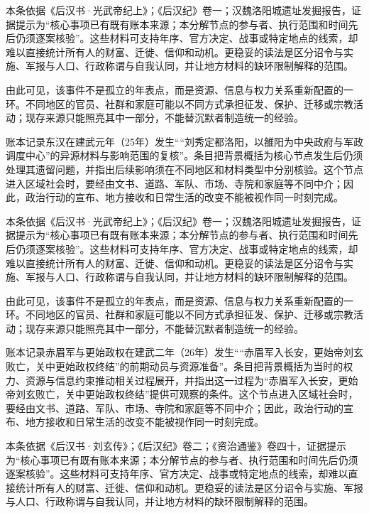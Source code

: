 本条依据《后汉书·光武帝纪上》；《后汉纪》卷一；汉魏洛阳城遗址发掘报告，证据提示为“核心事项已有既有账本来源；本分解节点的参与者、执行范围和时间先后仍须逐案核验”。这些材料可支持年序、官方决定、战事或特定地点的线索，却难以直接统计所有人的财富、迁徙、信仰和动机。更稳妥的读法是区分诏令与实施、军报与人口、行政称谓与自我认同，并让地方材料的缺环限制解释的范围。

由此可见，该事件不是孤立的年表点，而是资源、信息与权力关系重新配置的一环。不同地区的官员、社群和家庭可能以不同方式承担征发、保护、迁移或宗教活动；现存来源只能照亮其中一部分，不能替沉默者制造统一的经验。

账本记录东汉在建武元年（25年）发生““刘秀定都洛阳，以雒阳为中央政府与军政调度中心”的异源材料与影响范围的复核”。条目把背景概括为核心节点发生后仍须处理其遗留问题，并指出后续影响须在不同地区和材料类型中分别核验。这个节点进入区域社会时，要经由文书、道路、军队、市场、寺院和家庭等不同中介；因此，政治行动的宣布、地方接收和日常生活的改变不能被视作同一时刻完成。

本条依据《后汉书·光武帝纪上》；《后汉纪》卷一；汉魏洛阳城遗址发掘报告，证据提示为“核心事项已有既有账本来源；本分解节点的参与者、执行范围和时间先后仍须逐案核验”。这些材料可支持年序、官方决定、战事或特定地点的线索，却难以直接统计所有人的财富、迁徙、信仰和动机。更稳妥的读法是区分诏令与实施、军报与人口、行政称谓与自我认同，并让地方材料的缺环限制解释的范围。

由此可见，该事件不是孤立的年表点，而是资源、信息与权力关系重新配置的一环。不同地区的官员、社群和家庭可能以不同方式承担征发、保护、迁移或宗教活动；现存来源只能照亮其中一部分，不能替沉默者制造统一的经验。

账本记录赤眉军与更始政权在建武二年（26年）发生““赤眉军入长安，更始帝刘玄败亡，关中更始政权终结”的前期动员与资源准备”。条目把背景概括为当时的权力、资源与信息约束推动相关过程展开，并指出这一过程为“赤眉军入长安，更始帝刘玄败亡，关中更始政权终结”提供可观察的条件。这个节点进入区域社会时，要经由文书、道路、军队、市场、寺院和家庭等不同中介；因此，政治行动的宣布、地方接收和日常生活的改变不能被视作同一时刻完成。

本条依据《后汉书·刘玄传》；《后汉纪》卷二；《资治通鉴》卷四十，证据提示为“核心事项已有既有账本来源；本分解节点的参与者、执行范围和时间先后仍须逐案核验”。这些材料可支持年序、官方决定、战事或特定地点的线索，却难以直接统计所有人的财富、迁徙、信仰和动机。更稳妥的读法是区分诏令与实施、军报与人口、行政称谓与自我认同，并让地方材料的缺环限制解释的范围。

